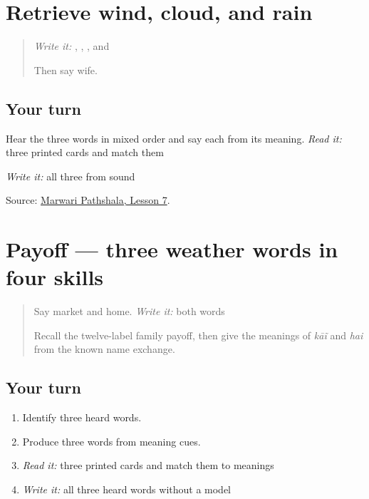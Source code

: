 \section[Practice]{Retrieve wind, cloud, and rain}

\label{lesson:MW-R11-weather-three}



\begin{quote}
\emph{Write it:} \textbf{}, \textbf{}, \textbf{}, and \textbf{}

Then say wife.
\end{quote}

\subsection*{Your turn}
Hear the three words in mixed order and say each from its meaning. \emph{Read it:} three printed cards and match them

\emph{Write it:} all three from sound

\begin{tcolorbox}[breakable,colback=teal!4,colframe=teal!35!black,title={Before you move on}]
Source: \href{https://www.marwaripathshala.com/marwari-lesson-7-english}{Marwari Pathshala, Lesson 7}.
\end{tcolorbox}
\section[Practice]{Payoff — three weather words in four skills}

\label{lesson:MW-C11-weather-three}



\begin{quote}
Say market and home. \emph{Write it:} both words

Recall the twelve-label family payoff, then give the meanings of \emph{kāĩ} and \emph{hai} from the known name exchange.
\end{quote}

\subsection*{Your turn}
\begin{enumerate}
\raggedright
  \item Identify three heard words.
  \item Produce three words from meaning cues.
  \item \emph{Read it:} three printed cards and match them to meanings
  \item \emph{Write it:} all three heard words without a model
\end{enumerate}

